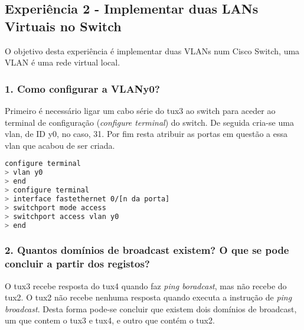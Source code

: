 \subsection*{Experiência 2 - Implementar duas LANs Virtuais no Switch}
O objetivo desta experiência é implementar duas VLANs num Cisco Switch, uma VLAN é uma rede virtual local.

\subsubsection{1. Como configurar a VLANy0?}
Primeiro é necessário ligar um cabo série do tux3 ao switch para aceder ao terminal de configuração (\emph{configure terminal}) do switch. De seguida cria-se uma vlan, de ID y0, no caso, 31. Por fim resta atribuir as portas em questão a essa vlan que acabou de ser criada.
\begin{lstlisting}[language=bash]
configure terminal
> vlan y0
> end
> configure terminal
> interface fastethernet 0/[n da porta]
> switchport mode access
> switchport access vlan y0
> end

\end{lstlisting}

\subsubsection{2. Quantos domínios de broadcast existem? O que se pode concluir a partir dos registos?}
O tux3 recebe resposta do tux4 quando faz \emph{ping boradcast}, mas não recebe do tux2. O tux2 não recebe nenhuma resposta quando executa a instrução de \emph{ping broadcast}. Desta forma pode-se concluir que existem dois domínios de broadcast, um que contem o tux3 e tux4, e outro que contém o tux2.
